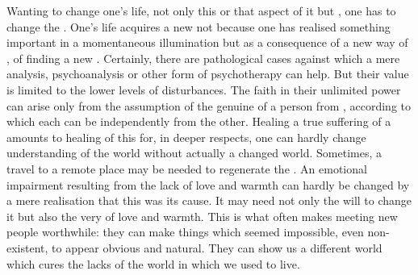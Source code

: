 \pa Wanting to change {one's life}, not only this or that aspect of it but
, one has to change the .  One's life acquires a new
 not because one has realised something important in a momentaneous
illumination but as a consequence of a new way of , of finding a new .  Certainly, there are
pathological cases against which a mere analysis, psychoanalysis or other
form of psychotherapy can help.  But their value is limited to the lower levels of
 disturbances.  The faith in their unlimited power can arise only
from the assumption of the genuine  of a person from , according to which each can be  independently from the
other.  Healing a true
suffering of a  amounts to healing  of this 
for, in deeper respects, one can hardly change understanding of the world
without actually  a changed world.  Sometimes, a travel to a
remote place may be needed to regenerate the .  An emotional impairment
resulting from the lack of love and warmth can hardly be changed by a mere
realisation that this was its cause.  It may need not only the will to change it
but also the very  of love and warmth.  This is what often makes
meeting new people worthwhile: they can make things which seemed impossible,
even non-existent, to appear obvious and natural.  They can show us a different
world which cures the lacks of the world in which we used to live.

